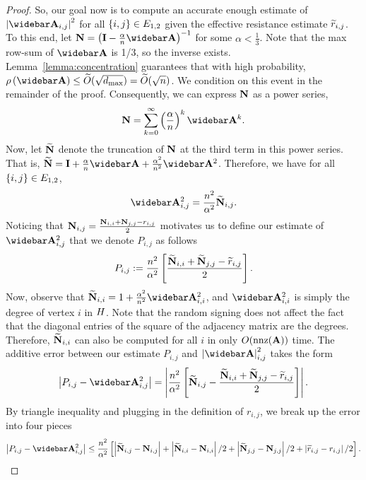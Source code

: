 \begin{proof}
So, our goal now is to compute an accurate enough estimate of $\abs{\As_{i,j}}^2$ for all $\left\{ i,j \right\} \in E_{1,2}$ given the effective resistance estimate $ \widetilde{r}_{i,j}$. To this end, let $\N = \left(\I - \frac{\alpha}{n}\Abar \right)^{-1}$ for some $\alpha < \frac{1}{3}$. Note that the max row-sum of $\Abar$ is 1/3, so the inverse exists. Lemma~\ref{lemma:concentration} guarantees that with high probability, $\Rho{\Abar} \leq \Otilde{\sqrt{\dmax}} = \Otilde{\sqrt{n}}$. We condition on this event in the remainder of the proof. Consequently, we can express $\mathbf{N}$ as a power series,
\begin{align*}
    \N = \sum_{k=0}^\infty \left(\frac{\alpha}{n}\right)^k \Abar^k. 
\end{align*}
Now, let $\widetilde{\mathbf{N}}$ denote the truncation of $\mathbf{N}$ at the third term in this power series. That is, $\Ntilde = \I + \frac{\alpha}{n} \Abar + \frac{\alpha^2}{n^2} \Abar^2$. Therefore, we have for all $\left\{ i,j \right\} \in E_{1, 2}$, 
\begin{align*}
    \As_{i,j}^2 = \frac{n^2}{\alpha^2}\Ntilde_{i, j}.
\end{align*}
Noticing that $\mathbf{N}_{i,j} = \frac{\mathbf{N}_{i,i} + \mathbf{N}_{j,j} - r_{i,j}}{2} $ 
 motivates us to define our estimate of $\As^2_{i,j}$ that we denote $P_{i,j}$ as follows
\begin{align*}
    P_{i,j} := \frac{n^2}{\alpha^2} \left[ \frac{\widetilde{\mathbf{N}}_{i,i} + \widetilde{\mathbf{N}}_{j,j} - \widetilde{r}_{i,j}}{2} \right].
\end{align*}
Now, observe that $\Ntilde_{i,i} = 1 + \frac{\alpha^2}{n^2}\As^2_{i,i}$, and $\As^2_{i,i}$ is simply the degree of vertex $i$ in $H$. Note that the random signing does not affect the fact that the diagonal entries of the square of the adjacency matrix are the degrees. Therefore, $\widetilde{\mathbf{N}}_{i,i}$ can also be computed for all $i$ in only $O(\mathrm{nnz}(\mathbf{A}))$ time. The additive error between our estimate $P_{i,j}$ and $\abs{\As}^2_{i,j}$ takes the form
\begin{align*}
    \abs{P_{i,j} - \As^2_{i,j}} = \abs{\frac{n^2}{\alpha^2}\sqrs{\Ntilde_{i,j} - \frac{\Ntilde_{i,i} + \Ntilde_{j,j} - \rtildeij}{2}}}.
\end{align*}
By triangle inequality and plugging in the definition of $r_{i,j}$, we break up the error into four pieces
\begin{align}\label{eq:error_in_four_pieces}
    \abs{P_{i,j} - \As^2_{i,j}} \leq \frac{n^2}{\alpha^2} \sqrs{\abs{\Ntilde_{i, j} - \N_{i, j}} + \abs{\Ntilde_{i, i} - \N_{i, i}}/2 + \abs{\Ntilde_{j, j} - \N_{j, j}}/2 +\abs{\rtildeij - r_{i, j}}/2 }.

\end{align}
\end{proof}
